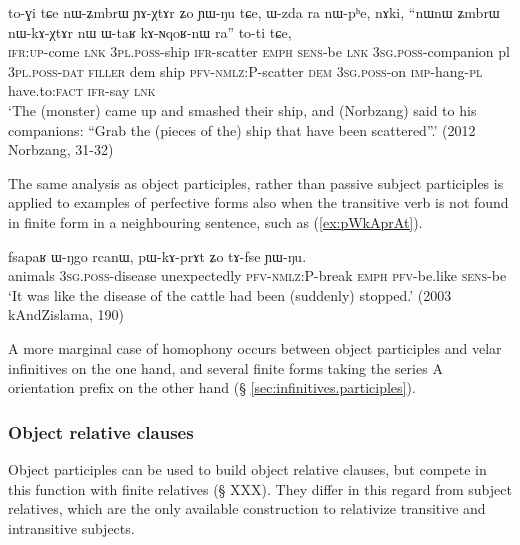 \begin{exe}
\ex \label{ex:YAXtAr.nWkAXtAr}
 \gll    to-ɣi tɕe nɯ-ʑmbrɯ ɲɤ-χtɤr ʑo ɲɯ-ŋu tɕe, ɯ-zda ra nɯ-pʰe, nɤki,  ``nɯnɯ ʑmbrɯ nɯ-kɤ-χtɤr nɯ ɯ-taʁ kɤ-ɴqoʁ-nɯ ra'' to-ti tɕe,  \\
 \textsc{ifr}:\textsc{up}-come \textsc{lnk} \textsc{3pl}.\textsc{poss}-ship \textsc{ifr}-scatter \textsc{emph} \textsc{sens}-be \textsc{lnk} \textsc{3sg}.\textsc{poss}-companion pl \textsc{3pl}.\textsc{poss}-\textsc{dat} \textsc{filler} dem ship \textsc{pfv}-\textsc{nmlz}:P-scatter \textsc{dem} \textsc{3sg}.\textsc{poss}-on \textsc{imp}-hang-\textsc{pl} have.to:\textsc{fact} \textsc{ifr}-say \textsc{lnk} \\
 \glt `The (monster) came up and smashed their ship, and (Norbzang) said to his companions: ``Grab the (pieces of the) ship that have been scattered''.' (2012 Norbzang, 31-32)
\end{exe}

The same analysis as object participles, rather than passive subject participles is applied to examples of perfective  forms also when the transitive verb is not found in finite form in a neighbouring sentence, such as (\ref{ex:pWkAprAt}).

\begin{exe}
\ex \label{ex:pWkAprAt}
 \gll fsapaʁ ɯ-ŋgo rcanɯ, pɯ-kɤ-prɤt ʑo tɤ-fse ɲɯ-ŋu. \\
 animals \textsc{3sg}.\textsc{poss}-disease unexpectedly \textsc{pfv}-\textsc{nmlz}:P-break \textsc{emph} \textsc{pfv}-be.like \textsc{sens}-be \\
 \glt  `It was like the disease of the cattle had been (suddenly) stopped.' (2003 kAndZislama, 190)
\end{exe}

A more marginal case of homophony occurs between object participles  and velar infinitives on the one hand, and several finite forms taking the series A orientation prefix  on the other hand (§ \ref{sec:infinitives.participles}).

\subsubsection{Object relative clauses} \label{sec:object.participle.relatives}
Object participles can be used to build object relative clauses, but compete in this function with finite relatives (§ XXX). They differ in this regard from subject relatives, which are the only available construction to relativize transitive and intransitive subjects.


